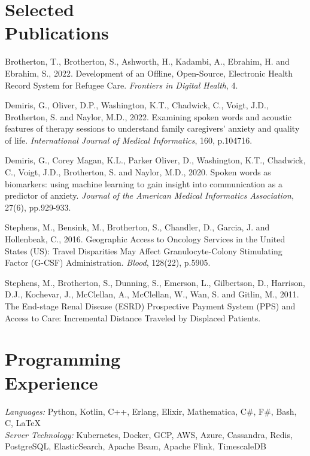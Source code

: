 \documentclass[margin,line]{resume}
\begin{document}
\begin{resume}
    \section{\mysidestyle Selected\\Publications}
    Brotherton, T., Brotherton, S., Ashworth, H., Kadambi, A., Ebrahim, H. and Ebrahim, S., 2022. Development of an Offline, Open-Source, Electronic Health Record System for Refugee Care. \emph{Frontiers in Digital Health}, 4.

    Demiris, G., Oliver, D.P., Washington, K.T., Chadwick, C., Voigt, J.D., Brotherton, S. and Naylor, M.D., 2022. Examining spoken words and acoustic features of therapy sessions to understand family caregivers’ anxiety and quality of life. \emph{International Journal of Medical Informatics}, 160, p.104716.

    Demiris, G., Corey Magan, K.L., Parker Oliver, D., Washington, K.T., Chadwick, C., Voigt, J.D., Brotherton, S. and Naylor, M.D., 2020. Spoken words as biomarkers: using machine learning to gain insight into communication as a predictor of anxiety. \emph{Journal of the American Medical Informatics Association}, 27(6), pp.929-933.

    Stephens, M., Bensink, M., Brotherton, S., Chandler, D., Garcia, J. and Hollenbeak, C., 2016. Geographic Access to Oncology Services in the United States (US): Travel Disparities May Affect Granulocyte-Colony Stimulating Factor (G-CSF) Administration. \emph{Blood}, 128(22), p.5905.

    Stephens, M., Brotherton, S., Dunning, S., Emerson, L., Gilbertson, D., Harrison, D.J., Kochevar, J., McClellan, A., McClellan, W., Wan, S. and Gitlin, M., 2011. The End-stage Renal Disease (ESRD) Prospective Payment System (PPS) and Access to Care: Incremental Distance Traveled by Displaced Patients.

\section{\mysidestyle Programming\\Experience}

\emph{Languages:} Python, Kotlin, C++, Erlang, Elixir, Mathematica,  C\#, F\#,
Bash, C, \LaTeX \\
\emph{Server Technology:} Kubernetes, Docker, GCP, AWS, Azure, Cassandra, Redis,
PostgreSQL, ElasticSearch, Apache Beam, Apache Flink, TimescaleDB

\end{resume}
\end{document}
